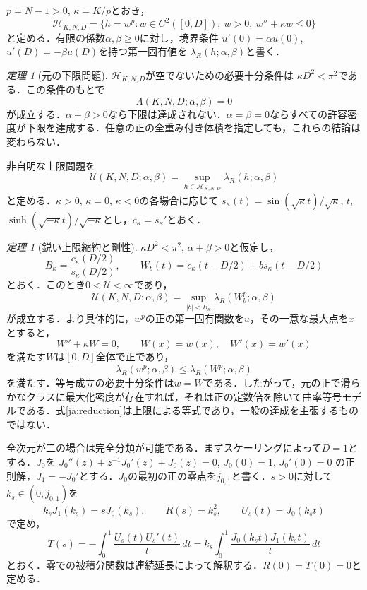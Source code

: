 \documentclass[12pt]{amsart}
\theoremstyle{definition}
\theoremstyle{remark}
\numberwithin{equation}{section}
\newtheorem{jthm}[thm]{定理}
\begin{document}
$p=N-1>0$, $\kappa=K/p$とおき，
\[
 \mathcal H_{K,N,D}=\{h=w^p:w\in C^2([0,D]),\ w>0,\ w''+\kappa w\le0\}
\]
と定める．有限の係数$\alpha,\beta\ge0$に対し，境界条件
$u'(0)=\alpha u(0)$, $u'(D)=-\beta u(D)$を持つ第一固有値を
$\lambda_R(h;\alpha,\beta)$と書く．

\begin{jthm}[元の下限問題]\label{ja:lower}
$\mathcal H_{K,N,D}$が空でないための必要十分条件は
$\kappa D^2<\pi^2$である．この条件のもとで
\[
 \Lambda(K,N,D;\alpha,\beta)=0
\]
が成立する．$\alpha+\beta>0$なら下限は達成されない．$\alpha=\beta=0$ならすべての許容密度が下限を達成する．任意の正の全重み付き体積を指定しても，これらの結論は変わらない．
\end{jthm}

非自明な上限問題を
\[
 \mathcal U(K,N,D;\alpha,\beta)=\sup_{h\in\mathcal H_{K,N,D}}
 \lambda_R(h;\alpha,\beta)
\]
と定める．$\kappa>0$, $\kappa=0$, $\kappa<0$の各場合に応じて
$s_\kappa(t)=\sin(\sqrt\kappa t)/\sqrt\kappa$, $t$,
$\sinh(\sqrt{-\kappa}t)/\sqrt{-\kappa}$とし，$c_\kappa=s_\kappa'$とおく．

\begin{jthm}[鋭い上限縮約と剛性]\label{ja:upper}
$\kappa D^2<\pi^2$, $\alpha+\beta>0$と仮定し，
\[
 B_\kappa=\frac{c_\kappa(D/2)}{s_\kappa(D/2)},\qquad
 W_b(t)=c_\kappa(t-D/2)+b s_\kappa(t-D/2)
\]
とおく．このとき$0<\mathcal U<\infty$であり，
\begin{equation}\label{ja:reduction}
 \mathcal U(K,N,D;\alpha,\beta)
 =\sup_{|b|<B_\kappa}\lambda_R(W_b^p;\alpha,\beta)
\end{equation}
が成立する．より具体的に，$w^p$の正の第一固有関数を$u$，その一意な最大点を$x$とすると，
\[
 W''+\kappa W=0,\qquad W(x)=w(x),\quad W'(x)=w'(x)
\]
を満たす$W$は$[0,D]$全体で正であり，
\[
 \lambda_R(w^p;\alpha,\beta)\le\lambda_R(W^p;\alpha,\beta)
\]
を満たす．等号成立の必要十分条件は$w=W$である．したがって，元の正で滑らかなクラスに最大化密度が存在すれば，それは正の定数倍を除いて曲率等号モデルである．式\eqref{ja:reduction}は上限による等式であり，一般の達成を主張するものではない．
\end{jthm}

全次元が二の場合は完全分類が可能である．まずスケーリングによって$D=1$とする．$J_0$を
$J_0''(z)+z^{-1}J_0'(z)+J_0(z)=0$, $J_0(0)=1$, $J_0'(0)=0$
の正則解，$J_1=-J_0'$とする．$J_0$の最初の正の零点を$j_{0,1}$と書く．$s>0$に対して$k_s\in(0,j_{0,1})$を
\begin{equation}\label{ja:radialroot}
 k_sJ_1(k_s)=sJ_0(k_s),\qquad
 R(s)=k_s^2,\qquad U_s(t)=J_0(k_st)
\end{equation}
で定め，
\begin{equation}\label{ja:threshold}
 T(s)=-\int_0^1\frac{U_s(t)U_s'(t)}{t}\,dt
 =k_s\int_0^1\frac{J_0(k_st)J_1(k_st)}{t}\,dt
\end{equation}
とおく．零での被積分関数は連続延長によって解釈する．$R(0)=T(0)=0$と定める．
\end{document}
